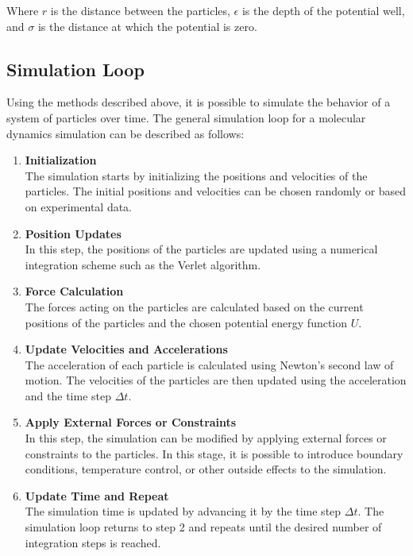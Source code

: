 Where $r$ is the distance between the particles, $\epsilon$ is the depth of the potential well, and $\sigma$ is the distance at which the potential is zero.

\subsection{Simulation Loop}

Using the methods described above, it is possible to simulate the behavior of a system of particles over time. The general simulation loop for a molecular dynamics simulation can be described as follows:

\begin{enumerate}
      \item \textbf{Initialization} \\
            The simulation starts by initializing the positions and velocities of the particles. The initial positions and velocities can be chosen randomly or based on experimental data.

      \item \textbf{Position Updates} \\
            In this step, the positions of the particles are updated using a numerical integration scheme such as the Verlet algorithm.

      \item \textbf{Force Calculation} \\
            The forces acting on the particles are calculated based on the current positions of the particles and the chosen potential energy function $U$.

      \item \textbf{Update Velocities and Accelerations} \\
            The acceleration of each particle is calculated using Newton's second law of motion. The velocities of the particles are then updated using the acceleration and the time step $\Delta t$.

      \item \textbf{Apply External Forces or Constraints} \\
            In this step, the simulation can be modified by applying external forces or constraints to the particles. In this stage, it is possible to introduce boundary conditions, temperature control, or other outside effects to the simulation.

      \item \textbf{Update Time and Repeat} \\
            The simulation time is updated by advancing it by the time step $\Delta t$. The simulation loop returns to step 2 and repeats until the desired number of integration steps is reached.
\end{enumerate}


